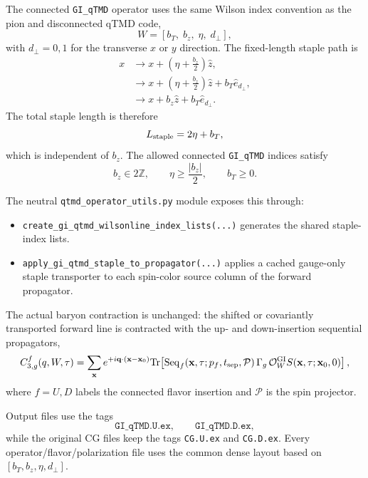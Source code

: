 \documentclass[11pt,a4paper]{article}
\begin{document}
The connected \texttt{GI\_qTMD} operator uses the same Wilson index convention as
the pion and disconnected qTMD code,
\begin{equation}
  W = [b_T,\; b_z,\; \eta,\; d_\perp],
\end{equation}
with $d_\perp=0,1$ for the transverse $x$ or $y$ direction.  The fixed-length
staple path is
\begin{align}
  x
  &\rightarrow x + \left(\eta + \frac{b_z}{2}\right)\hat z, \\
  &\rightarrow x + \left(\eta + \frac{b_z}{2}\right)\hat z
       + b_T \hat e_{d_\perp}, \\
  &\rightarrow x + b_z \hat z + b_T \hat e_{d_\perp}.
\end{align}
The total staple length is therefore
\begin{equation}
  L_{\rm staple} = 2\eta + b_T,
\end{equation}
which is independent of $b_z$.  The allowed connected \texttt{GI\_qTMD}
indices satisfy
\begin{equation}
  b_z \in 2\mathbb{Z}, \qquad \eta \geq \frac{|b_z|}{2}, \qquad b_T \geq 0.
\end{equation}

The neutral \texttt{qtmd\_operator\_utils.py} module exposes this through:
\begin{itemize}
  \item \texttt{create\_gi\_qtmd\_wilsonline\_index\_lists(...)} generates
    the shared staple-index lists.
  \item \texttt{apply\_gi\_qtmd\_staple\_to\_propagator(...)}
    applies a cached gauge-only staple transporter to each spin-color source
    column of the forward propagator.
\end{itemize}
The actual baryon contraction is unchanged: the shifted or covariantly
transported forward line is contracted with the up- and down-insertion
sequential propagators,
\begin{equation}
  C_{3,g}^{f}(q,W,\tau)
  =
  \sum_{\mathbf{x}}
  e^{+i\mathbf{q}\cdot(\mathbf{x}-\mathbf{x}_0)}
  \mathrm{Tr}\!\left[
    \mathrm{Seq}_{f}(\mathbf{x},\tau;p_f,t_{\rm sep},\mathcal{P})\,
    \Gamma_g\,
    \mathcal{O}_{W}^{\rm GI} S(\mathbf{x},\tau;\mathbf{x}_0,0)
  \right],
\end{equation}
where $f=U,D$ labels the connected flavor insertion and $\mathcal{P}$ is the
spin projector.

Output files use the tags
\begin{equation}
  \texttt{GI\_qTMD.U.ex}, \qquad \texttt{GI\_qTMD.D.ex},
\end{equation}
while the original CG files keep the tags \texttt{CG.U.ex} and
\texttt{CG.D.ex}.  Every operator/flavor/polarization file uses the common
dense layout based on $[b_T,b_z,\eta,d_\perp]$.
\end{document}
